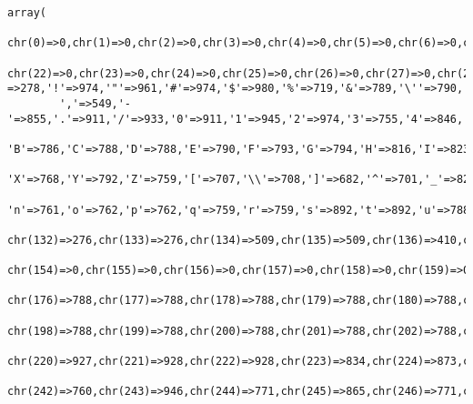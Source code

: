 \footnotesize\begin{verbatim}array(
        chr(0)=>0,chr(1)=>0,chr(2)=>0,chr(3)=>0,chr(4)=>0,chr(5)=>0,chr(6)=>0,chr(7)=>0,chr(8)=>0,chr(9)=>0,chr(10)=>0,chr(11)=>0,chr(12)=>0,chr(13)=>0,chr(14)=>0,chr(15)=>0,chr(16)=>0,chr(17)=>0,chr(18)=>0,chr(19)=>0,chr(20)=>0,chr(21)=>0,
        chr(22)=>0,chr(23)=>0,chr(24)=>0,chr(25)=>0,chr(26)=>0,chr(27)=>0,chr(28)=>0,chr(29)=>0,chr(30)=>0,chr(31)=>0, =>278,'!'=>974,'"'=>961,'#'=>974,'$'=>980,'%'=>719,'&'=>789,'\''=>790,'('=>791,')'=>690,'*'=>960,'+'=>939,
        ','=>549,'-'=>855,'.'=>911,'/'=>933,'0'=>911,'1'=>945,'2'=>974,'3'=>755,'4'=>846,'5'=>762,'6'=>761,'7'=>571,'8'=>677,'9'=>763,':'=>760,';'=>759,'<'=>754,'='=>494,'>'=>552,'?'=>537,'@'=>577,'A'=>692,
        'B'=>786,'C'=>788,'D'=>788,'E'=>790,'F'=>793,'G'=>794,'H'=>816,'I'=>823,'J'=>789,'K'=>841,'L'=>823,'M'=>833,'N'=>816,'O'=>831,'P'=>923,'Q'=>744,'R'=>723,'S'=>749,'T'=>790,'U'=>792,'V'=>695,'W'=>776,
        'X'=>768,'Y'=>792,'Z'=>759,'['=>707,'\\'=>708,']'=>682,'^'=>701,'_'=>826,'`'=>815,'a'=>789,'b'=>789,'c'=>707,'d'=>687,'e'=>696,'f'=>689,'g'=>786,'h'=>787,'i'=>713,'j'=>791,'k'=>785,'l'=>791,'m'=>873,
        'n'=>761,'o'=>762,'p'=>762,'q'=>759,'r'=>759,'s'=>892,'t'=>892,'u'=>788,'v'=>784,'w'=>438,'x'=>138,'y'=>277,'z'=>415,'{'=>392,'|'=>392,'}'=>668,'~'=>668,chr(127)=>0,chr(128)=>390,chr(129)=>390,chr(130)=>317,chr(131)=>317,
        chr(132)=>276,chr(133)=>276,chr(134)=>509,chr(135)=>509,chr(136)=>410,chr(137)=>410,chr(138)=>234,chr(139)=>234,chr(140)=>334,chr(141)=>334,chr(142)=>0,chr(143)=>0,chr(144)=>0,chr(145)=>0,chr(146)=>0,chr(147)=>0,chr(148)=>0,chr(149)=>0,chr(150)=>0,chr(151)=>0,chr(152)=>0,chr(153)=>0,
        chr(154)=>0,chr(155)=>0,chr(156)=>0,chr(157)=>0,chr(158)=>0,chr(159)=>0,chr(160)=>0,chr(161)=>732,chr(162)=>544,chr(163)=>544,chr(164)=>910,chr(165)=>667,chr(166)=>760,chr(167)=>760,chr(168)=>776,chr(169)=>595,chr(170)=>694,chr(171)=>626,chr(172)=>788,chr(173)=>788,chr(174)=>788,chr(175)=>788,
        chr(176)=>788,chr(177)=>788,chr(178)=>788,chr(179)=>788,chr(180)=>788,chr(181)=>788,chr(182)=>788,chr(183)=>788,chr(184)=>788,chr(185)=>788,chr(186)=>788,chr(187)=>788,chr(188)=>788,chr(189)=>788,chr(190)=>788,chr(191)=>788,chr(192)=>788,chr(193)=>788,chr(194)=>788,chr(195)=>788,chr(196)=>788,chr(197)=>788,
        chr(198)=>788,chr(199)=>788,chr(200)=>788,chr(201)=>788,chr(202)=>788,chr(203)=>788,chr(204)=>788,chr(205)=>788,chr(206)=>788,chr(207)=>788,chr(208)=>788,chr(209)=>788,chr(210)=>788,chr(211)=>788,chr(212)=>894,chr(213)=>838,chr(214)=>1016,chr(215)=>458,chr(216)=>748,chr(217)=>924,chr(218)=>748,chr(219)=>918,
        chr(220)=>927,chr(221)=>928,chr(222)=>928,chr(223)=>834,chr(224)=>873,chr(225)=>828,chr(226)=>924,chr(227)=>924,chr(228)=>917,chr(229)=>930,chr(230)=>931,chr(231)=>463,chr(232)=>883,chr(233)=>836,chr(234)=>836,chr(235)=>867,chr(236)=>867,chr(237)=>696,chr(238)=>696,chr(239)=>874,chr(240)=>0,chr(241)=>874,
        chr(242)=>760,chr(243)=>946,chr(244)=>771,chr(245)=>865,chr(246)=>771,chr(247)=>888,chr(248)=>967,chr(249)=>888,chr(250)=>831,chr(251)=>873,chr(252)=>927,chr(253)=>970,chr(254)=>918,chr(255)=>0)
\end{verbatim}\normalsize 
